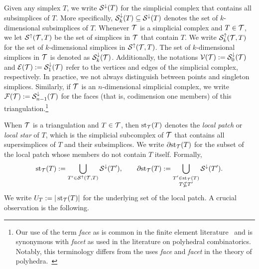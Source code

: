 \documentclass[10pt,letterpaper]{article}
\begin{document}
Given any simplex $T$, we write ${\mathcal S}^{\downarrow}(T)$ for the simplicial complex that contains all subsimplices of $T$. 
More specifically, ${\mathcal S}^{\downarrow}_{{k}}(T) \subseteq {\mathcal S}^{\downarrow}(T)$ denotes the set of $k$-dimensional subsimplices of $T$. 
Whenever ${\mathcal T}$ is a simplicial complex and $T \in {\mathcal T}$, we let ${\mathcal S}^{\uparrow}({\mathcal T},T)$ be the set of simplices in ${\mathcal T}$ that contain $T$.
We write ${\mathcal S}^{\uparrow}_{k}({\mathcal T},T)$ for the set of $k$-dimensional simplices in ${\mathcal S}^{\uparrow}({\mathcal T},T)$. 
The set of $k$-dimensional simplices in ${\mathcal T}$ is denoted as ${\mathcal S}^{\downarrow}_{{k}}({\mathcal T})$. 
Additionally, the notations ${\mathcal V}({\mathcal T}) := {\mathcal S}^{\downarrow}_{0}({\mathcal T})$ and ${\mathcal E}({\mathcal T}) := {\mathcal S}^{\downarrow}_{1}({\mathcal T})$ refer to the vertices and edges of the simplicial complex, respectively. 
In practice, we not always distinguish between points and singleton simplices. 
Similarly, if ${\mathcal T}$ is an $n$-dimensional simplicial complex, we write ${\mathcal F}({\mathcal T}) := {\mathcal S}^{\downarrow}_{n-1}({\mathcal T})$ for the faces (that is, codimension one members) of this triangulation.\footnote{
    Our use of the term \textit{face} as is common in the finite element literature~\cite{brenner2008mathematical}
    and is synonymous with \textit{facet} as used in the literature on polyhedral combinatorics.~\cite{schrijver1998theory}
    Notably, this terminology differs from the uses \textit{face} and \textit{facet} in the theory of polyhedra.~\cite{ziegler2012lectures}
}

When ${\mathcal T}$ is a triangulation and $T \in {\mathcal T}$, then $\operatorname{st}_{{\mathcal T}}(T)$ denotes the \emph{local patch} or \textit{local star} of $T$, 
which is the simplicial subcomplex of ${\mathcal T}$ that contains all supersimplices of $T$ and their subsimplices. 
We write ${\partial \rm st}_{{\mathcal T}}(T)$ for the subset of the local patch whose members do not contain $T$ itself. 
Formally,
\begin{gather*}
    \operatorname{st}_{{\mathcal T}}(T) := \bigcup_{ T' \in {\mathcal S}^{\uparrow}({\mathcal T},T) } {\mathcal S}^{\downarrow}(T'),
    \qquad 
    {\partial \rm st}_{{\mathcal T}}(T) := \bigcup_{ \substack{ T' \in \operatorname{st}_{{\mathcal T}}(T) \\ T \nsubseteq T' } } {\mathcal S}^{\downarrow}(T').
\end{gather*}
We write $U_T := | \operatorname{st}_{{\mathcal T}}(T) |$ for the underlying set of the local patch. 
A crucial observation is the following.  
\end{document}
